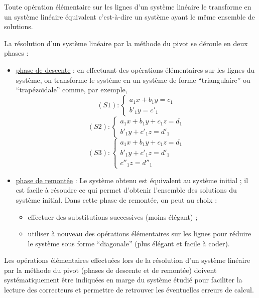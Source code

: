 \begin{prop}
	Toute opération élémentaire sur les lignes d’un système linéaire le transforme en un système linéaire équivalent c’est-à-dire un système ayant le même ensemble de solutions.
\end{prop}

\begin{defprop}
	La résolution d’un système linéaire par la méthode du pivot se déroule en deux phases :
	\begin{itemize}
		\item \underline{phase de descente} : en effectuant des opérations élémentaires sur les lignes du système, on transforme le système en un système de forme “triangulaire” ou “trapézoïdale” comme, par exemple,
		      \[(S1) : \begin{cases} a_1x+b_1y = c_1 \\ b'_1y = c'_1 \end{cases}\]
		      \[(S2) : \begin{cases} a_1x+b_1y+c_1z = d_1 \\ b'_1y+c'_1z = d'_1 \end{cases}\]
		      \[(S3) : \begin{cases} a_1x+b_1y+c_1z = d_1 \\ b'_1y+c'_1z = d'_1 \\ c''_1z = d''_1 \end{cases}\]
		\item \underline{phase de remontée} : Le système obtenu est équivalent au système initial ; il est facile à résoudre ce qui permet d’obtenir l’ensemble des solutions du système initial. Dans cette phase de remontée, on peut au choix :
		      \begin{itemize}
			      \item effectuer des substitutions successives (moins élégant) ;
			      \item utiliser à nouveau des opérations élémentaires sur les lignes pour réduire le système sous forme “diagonale” (plus élégant et facile à coder).
		      \end{itemize}
	\end{itemize}
\end{defprop}
\begin{rem}
	Les opérations élémentaires effectuées lors de la résolution d’un système linéaire par la méthode du pivot (phases de descente et de remontée) doivent systématiquement être indiquées en marge du système étudié pour faciliter la lecture des correcteurs et permettre de retrouver les éventuelles erreurs de calcul.
\end{rem}

